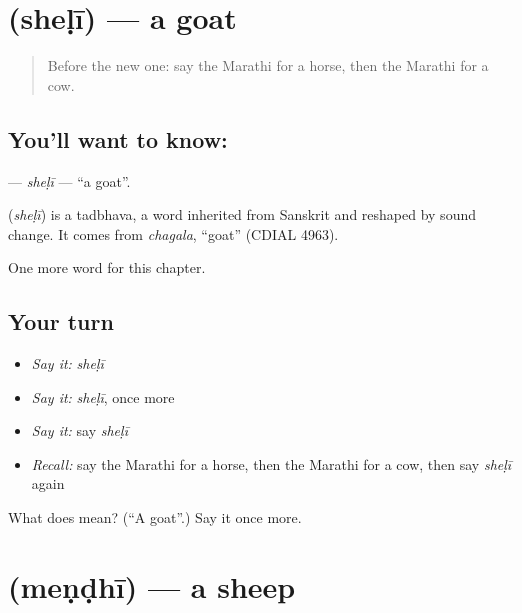 \section[\texorpdfstring{\mr{शेळी} (sheḷī)}{शेळी (sheḷī)}]{ (sheḷī) — a goat}

\label{lesson:MR-C100-sheli}



\begin{quote}
Before the new one: say the Marathi for a horse, then the Marathi for a cow.
\end{quote}

\subsection*{You'll want to know: }
\textbf{} — \emph{sheḷī} — \textquotedblleft{}a goat\textquotedblright{}.

\begin{cousinweb}
\textbf{} (\emph{sheḷī}) is a tadbhava, a word inherited from Sanskrit and reshaped by sound change. It comes from \emph{chagala}, \textquotedblleft{}goat\textquotedblright{} (CDIAL 4963).
\end{cousinweb}

\begin{grammarlens}[title={What you've built}]
One more word for this chapter.
\end{grammarlens}

\subsection*{Your turn}
\begin{itemize}
\raggedright
  \item \emph{Say it:} \emph{sheḷī}
  \item \emph{Say it:} \emph{sheḷī}, once more
  \item \emph{Say it:} say \emph{sheḷī}
  \item \emph{Recall:} say the Marathi for a horse, then the Marathi for a cow, then say \emph{sheḷī} again
\end{itemize}

\begin{tcolorbox}[breakable,colback=teal!4,colframe=teal!35!black,title={Before you move on}]
What does  mean? (\textquotedblleft{}A goat\textquotedblright{}.) Say it once more.
\end{tcolorbox}
\section[\texorpdfstring{\mr{मेंढी} (meṇḍhī)}{मेंढी (meṇḍhī)}]{ (meṇḍhī) — a sheep}

